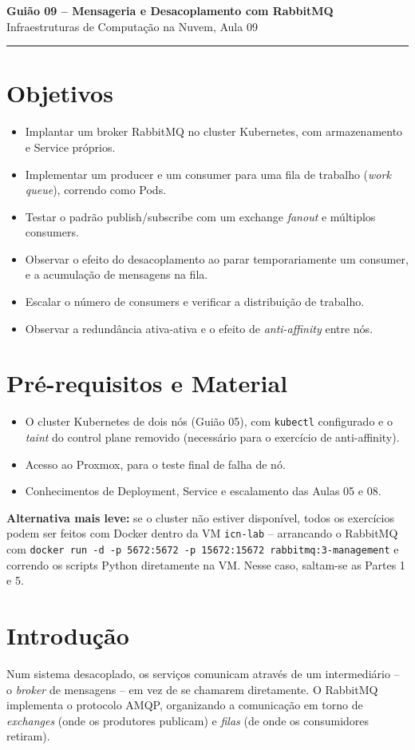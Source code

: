 \documentclass[11pt,a4paper]{article}
\newcommand{\guiaotitle}[2]{%
  \begin{center}
  {\Large\bfseries\color{TextEspresso} #1}\\[0.3cm]
  {\normalsize\color{NudeTaupe} #2}\\[0.2cm]
  {\color{NudeTaupe}\rule{4cm}{0.5pt}}
  \end{center}
  \vspace{0.5cm}
}
\begin{document}
\guiaotitle{Guião 09 -- Mensageria e Desacoplamento com RabbitMQ}{Infraestruturas de Computação na Nuvem, Aula 09}

\section{Objetivos}
\begin{itemize}[itemsep=0.2cm]
  \item Implantar um broker RabbitMQ no cluster Kubernetes, com armazenamento e Service próprios.
  \item Implementar um producer e um consumer para uma fila de trabalho (\emph{work queue}), correndo como Pods.
  \item Testar o padrão publish/subscribe com um exchange \emph{fanout} e múltiplos consumers.
  \item Observar o efeito do desacoplamento ao parar temporariamente um consumer, e a acumulação de mensagens na fila.
  \item Escalar o número de consumers e verificar a distribuição de trabalho.
  \item Observar a redundância ativa-ativa e o efeito de \emph{anti-affinity} entre nós.
\end{itemize}

\section{Pré-requisitos e Material}
\begin{itemize}[itemsep=0.2cm]
  \item O cluster Kubernetes de dois nós (Guião 05), com \texttt{kubectl} configurado e o \emph{taint} do control plane removido (necessário para o exercício de anti-affinity).
  \item Acesso ao Proxmox, para o teste final de falha de nó.
  \item Conhecimentos de Deployment, Service e escalamento das Aulas 05 e 08.
\end{itemize}

\textbf{Alternativa mais leve:} se o cluster não estiver disponível, todos os exercícios podem ser feitos com Docker dentro da VM \texttt{icn-lab} -- arrancando o RabbitMQ com \texttt{docker run -d -p 5672:5672 -p 15672:15672 rabbitmq:3-management} e correndo os scripts Python diretamente na VM. Nesse caso, saltam-se as Partes 1 e 5.

\section{Introdução}
Num sistema desacoplado, os serviços comunicam através de um intermediário -- o \emph{broker} de mensagens -- em vez de se chamarem diretamente. O RabbitMQ implementa o protocolo AMQP, organizando a comunicação em torno de \emph{exchanges} (onde os produtores publicam) e \emph{filas} (de onde os consumidores retiram).
\end{document}
